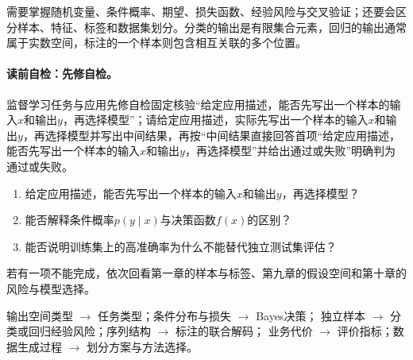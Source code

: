 
\label{struct:V1-C11-CH02}
\begin{prerequisitebox}
需要掌握随机变量、条件概率、期望、损失函数、经验风险与交叉验证；还要会区分样本、特征、标签和数据集划分。分类的输出是有限集合元素，回归的输出通常属于实数空间，标注的一个样本则包含相互关联的多个位置。
\end{prerequisitebox}

\label{struct:V1-C11-CH03}
\paragraph{读前自检：先修自检。}监督学习任务与应用先修自检固定核验“给定应用描述，能否先写出一个样本的输入$x$和输出$y$，再选择模型”；请给定应用描述，实际先写出一个样本的输入$x$和输出$y$，再选择模型并写出中间结果，再按“中间结果直接回答首项“给定应用描述，能否先写出一个样本的输入$x$和输出$y$，再选择模型”并给出通过或失败”明确判为通过或失败。\par

\begin{precheckbox}
\begin{enumerate}[leftmargin=2.2em]
  \item 给定应用描述，能否先写出一个样本的输入$x$和输出$y$，再选择模型？
  \item 能否解释条件概率$p(y\mid x)$与决策函数$f(x)$的区别？
  \item 能否说明训练集上的高准确率为什么不能替代独立测试集评估？
\end{enumerate}
若有一项不能完成，依次回看第一章的样本与标签、第九章的假设空间和第十章的风险与模型选择。
\end{precheckbox}

\label{struct:V1-C11-CH04}
\begin{dependencybox}
输出空间类型 $\to$ 任务类型；条件分布与损失 $\to$ Bayes决策；
独立样本 $\to$ 分类或回归经验风险；序列结构 $\to$ 标注的联合解码；
业务代价 $\to$ 评价指标；数据生成过程 $\to$ 划分方案与方法选择。
\end{dependencybox}

